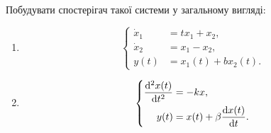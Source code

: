 \begin{problem}
    Побудувати спостерігач такої системи у загальному вигляді:
    \begin{enumerate}
    	\item \[ \left\{ \begin{aligned}
    		\dot x_1 &= t x_1 + x_2, \\
    		\dot x_2 &= x_1 - x_2, \\
    		y(t) &= x_1(t) + b x_2(t).
    	\end{aligned} \right. \]

    	\item \[ \left\{ \begin{aligned}
    		\frac{\mathop{}\!\mathrm{d}^2 x(t)}{\mathop{}\!\mathrm{d} t^2} &= -kx, \\
    		y(t) &= x(t) + \beta \frac{\mathop{}\!\mathrm{d} x(t)}{\mathop{}\!\mathrm{d} t}.
    	\end{aligned} \right. \]
    \end{enumerate}
\end{problem}

